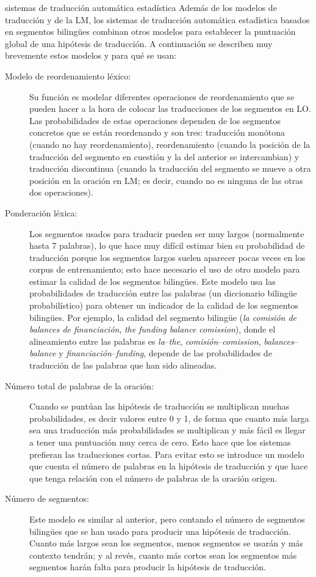 \begin{persabermes}{sistemas de traducción automática estadística} Además de los modelos de traducción y de la LM, los sistemas de traducción automática estadística basados en segmentos bilingües combinan otros modelos para establecer la puntuación global de una hipótesis de traducción. A continuación se describen muy brevemente estos modelos y para qué se usan: \begin{description} \item[Modelo de reordenamiento léxico:] Su función es modelar diferentes operaciones de reordenamiento que se pueden hacer a la hora de colocar las traducciones de los segmentos en LO. Las probabilidades de estas operaciones dependen de los segmentos concretos que se están reordenando y son tres: traducción monótona (cuando no hay reordenamiento), reordenamiento (cuando la posición de la traducción del segmento en cuestión y la del anterior se intercambian) y traducción discontinua (cuando la traducción del segmento se mueve a otra posición en la oración en LM; es decir, cuando no es ninguna de las otras dos operaciones). \item[Ponderación léxica:] Los segmentos usados para traducir pueden ser muy largos (normalmente hasta 7 palabras), lo que hace muy difícil estimar bien su probabilidad de traducción porque los segmentos largos suelen aparecer pocas veces en los corpus de entrenamiento; esto hace necesario el uso de otro modelo para estimar la calidad de los segmentos bilingües. Este modelo usa las probabilidades de traducción entre las palabras (un diccionario bilingüe probabilístico) para obtener un indicador de la calidad de los segmentos bilingües. Por ejemplo, la calidad del segmento bilingüe (\emph{la comisión de balances de financiación}, \emph{the funding balance comission}), donde el alineamiento entre las palabras es \emph{la}--\emph{the}, \emph{comisión}--\emph{comission}, \emph{balances}--\emph{balance} y \emph{financiación}--\emph{funding}, depende de las probabilidades de traducción de las palabras que han sido alineadas. \item[Número total de palabras de la oración:] Cuando se puntúan las hipótesis de traducción se multiplican muchas probabilidades, es decir valores entre 0 y 1, de forma que cuanto más larga sea una traducción más probabilidades se multiplican y más fácil es llegar a tener una puntuación muy cerca de cero. Esto hace que los sistemas prefieran las traducciones cortas. Para evitar esto se introduce un modelo que cuenta el número de palabras en la hipótesis de traducción y que hace que tenga relación con el número de palabras de la oración origen. \item[Número de segmentos:] Este modelo es similar al anterior, pero contando el número de segmentos bilingües que se han usado para producir una hipótesis de traducción. Cuanto más largos sean los segmentos, menos segmentos se usarán y más contexto tendrán; y al revés, cuanto más cortos sean los segmentos más segmentos harán falta para producir la hipótesis de traducción. \end{description} 


\end{persabermes}
